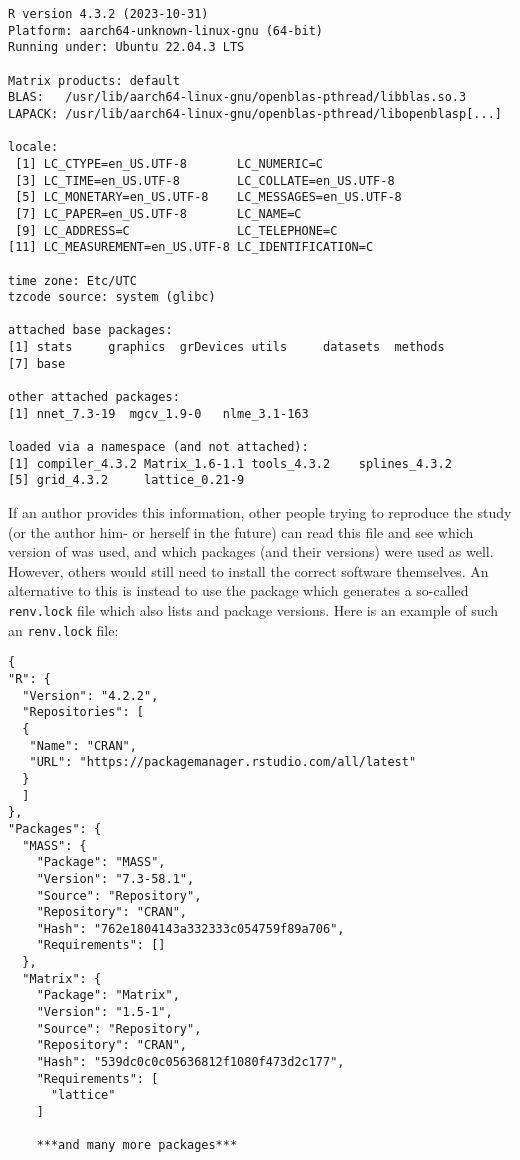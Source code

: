 \documentclass[
  article]{jss}
\begin{document}
\begin{verbatim}
R version 4.3.2 (2023-10-31)
Platform: aarch64-unknown-linux-gnu (64-bit)
Running under: Ubuntu 22.04.3 LTS

Matrix products: default
BLAS:   /usr/lib/aarch64-linux-gnu/openblas-pthread/libblas.so.3 
LAPACK: /usr/lib/aarch64-linux-gnu/openblas-pthread/libopenblasp[...]

locale:
 [1] LC_CTYPE=en_US.UTF-8       LC_NUMERIC=C              
 [3] LC_TIME=en_US.UTF-8        LC_COLLATE=en_US.UTF-8    
 [5] LC_MONETARY=en_US.UTF-8    LC_MESSAGES=en_US.UTF-8   
 [7] LC_PAPER=en_US.UTF-8       LC_NAME=C                 
 [9] LC_ADDRESS=C               LC_TELEPHONE=C            
[11] LC_MEASUREMENT=en_US.UTF-8 LC_IDENTIFICATION=C       

time zone: Etc/UTC
tzcode source: system (glibc)

attached base packages:
[1] stats     graphics  grDevices utils     datasets  methods  
[7] base     

other attached packages:
[1] nnet_7.3-19  mgcv_1.9-0   nlme_3.1-163

loaded via a namespace (and not attached):
[1] compiler_4.3.2 Matrix_1.6-1.1 tools_4.3.2    splines_4.3.2 
[5] grid_4.3.2     lattice_0.21-9
\end{verbatim}

If an author provides this information, other people trying to reproduce
the study (or the author him- or herself in the future) can read this
file and see which version of  was used, and which packages
(and their versions) were used as well. However, others would still need
to install the correct software themselves. An alternative to this is
instead to use the  package which generates a so-called
\texttt{renv.lock} file which also lists  and package
versions. Here is an example of such an \texttt{renv.lock} file:

\begin{verbatim}
{
"R": {
  "Version": "4.2.2",
  "Repositories": [
  {
   "Name": "CRAN",
   "URL": "https://packagemanager.rstudio.com/all/latest"
  }
  ]
},
"Packages": {
  "MASS": {
    "Package": "MASS",
    "Version": "7.3-58.1",
    "Source": "Repository",
    "Repository": "CRAN",
    "Hash": "762e1804143a332333c054759f89a706",
    "Requirements": []
  },
  "Matrix": {
    "Package": "Matrix",
    "Version": "1.5-1",
    "Source": "Repository",
    "Repository": "CRAN",
    "Hash": "539dc0c0c05636812f1080f473d2c177",
    "Requirements": [
      "lattice"
    ]

    ***and many more packages***
\end{verbatim}
\end{document}
